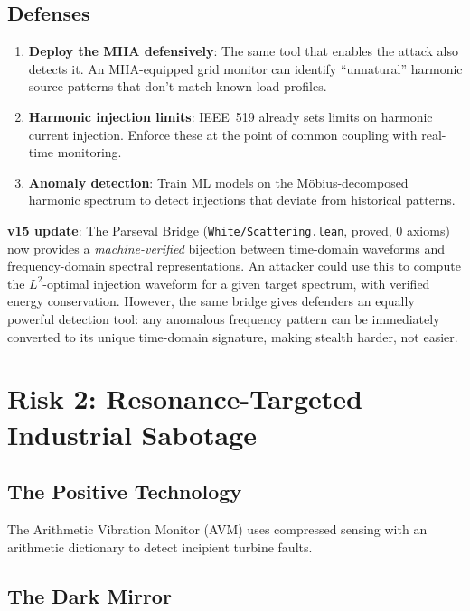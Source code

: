 \documentclass[11pt,a4paper]{article}
\begin{document}
\subsection{Defenses}

\begin{enumerate}
  \item \textbf{Deploy the MHA defensively}: The same tool that
    enables the attack also detects it. An MHA-equipped grid monitor
    can identify ``unnatural'' harmonic source patterns that don't
    match known load profiles.
  \item \textbf{Harmonic injection limits}: IEEE~519 already sets
    limits on harmonic current injection. Enforce these at the
    point of common coupling with real-time monitoring.
  \item \textbf{Anomaly detection}: Train ML models on the
    M\"obius-decomposed harmonic spectrum to detect injections that
    deviate from historical patterns.
\end{enumerate}

\textbf{v15 update}: The Parseval Bridge
(\texttt{White/Scattering.lean}, proved, 0 axioms) now provides a
\emph{machine-verified} bijection between time-domain waveforms and
frequency-domain spectral representations. An attacker could use this
to compute the $L^2$-optimal injection waveform for a given target
spectrum, with verified energy conservation. However, the same bridge
gives defenders an equally powerful detection tool: any anomalous
frequency pattern can be immediately converted to its unique
time-domain signature, making stealth harder, not easier.

\section{Risk 2: Resonance-Targeted Industrial Sabotage}
\label{sec:vibration}

\subsection{The Positive Technology}

The Arithmetic Vibration Monitor (AVM) uses compressed sensing with
an arithmetic dictionary to detect incipient turbine faults.

\subsection{The Dark Mirror}
\end{document}
